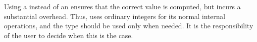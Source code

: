 Using a  instead of an  ensures that the
correct value is computed, but incurs a substantial overhead.
Thus, {\smart} uses ordinary integers for its normal internal operations,
and the  type should be used only when needed.
It is the responsibility of the user to decide when this is the case.



\begin{comment}
\subsection{A \Code{real} iterator}

\TBD{Is this something we want to forbid from future versions?
In restrospect, it might be more trouble than it is worth it...}

Array iterators can be of type \Code{real}, as in the following
example defining a three-element array \Code{y}:
\begin{lstlisting}
for (real x in {O.1,O.2,0.4}) {
  real y[x] := 3*x*x;
}
\end{lstlisting}
Care must be taken to avoid indexing errors due to the finite precision of
floating-point arithmetic.  
To address this problem, {\smart} considers two floating-point indices to be
equal if they are within an absolute or relative precision $\delta$.
In the above example, {\smart} evaluates the expression \Code{y[x]} to 
\Code{y[0.1]} for any value of \Code{x} satisfying 
\[
  \begin{array}{c@{~~~~}l}
     0.1-\delta \leq \Code{x} \leq 0.1+\delta
     & 
     \mbox{if absolute precision is used,}
     \\
     0.1-0.1\delta \leq \Code{x} \leq 0.1+0.1\delta
     &
     \mbox{if relative precision is used.}
  \end{array}
\]
The value of $\delta$ is dictated by the option \Code{IndexPrecision}
(with a default of $10^{-5}$) and the
type of precision test is dictated by the option \Code{IndexPrecisionTest}
(with default value \Code{RELATIVE}, the other possible value
being \Code{ABSOLUTE}).
Thus, if the options are set using the statements
\begin{lstlisting}
# IndexPrecisionTest ABSOLUTE
# IndexPrecision  0.015
\end{lstlisting}
then the expression \Code{y[0.099]} evaluates to \Code{0.03}, and the
expression \Code{y[0.08]} results in a ``range error'' message,
and evaluates to \Code{null}.
\end{comment}





